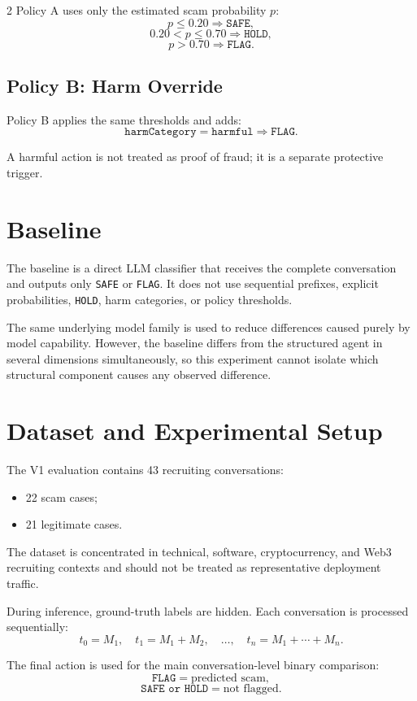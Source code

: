 \documentclass{article}
\begin{document}
\begin{multicols}{2}
Policy A uses only the estimated scam probability $p$:
\[
p \le 0.20 \Rightarrow \texttt{SAFE},
\]
\[
0.20 < p \le 0.70 \Rightarrow \texttt{HOLD},
\]
\[
p > 0.70 \Rightarrow \texttt{FLAG}.
\]

\subsection{Policy B: Harm Override}

Policy B applies the same thresholds and adds:
\[
\texttt{harmCategory}=\texttt{harmful}
\Rightarrow \texttt{FLAG}.
\]

A harmful action is not treated as proof of fraud; it is a separate protective trigger.

\section{Baseline}

The baseline is a direct LLM classifier that receives the complete conversation and outputs only \texttt{SAFE} or \texttt{FLAG}. It does not use sequential prefixes, explicit probabilities, \texttt{HOLD}, harm categories, or policy thresholds.

The same underlying model family is used to reduce differences caused purely by model capability. However, the baseline differs from the structured agent in several dimensions simultaneously, so this experiment cannot isolate which structural component causes any observed difference.

\section{Dataset and Experimental Setup}

The V1 evaluation contains 43 recruiting conversations:
\begin{itemize}
    \item 22 scam cases;
    \item 21 legitimate cases.
\end{itemize}

The dataset is concentrated in technical, software, cryptocurrency, and Web3 recruiting contexts and should not be treated as representative deployment traffic.

During inference, ground-truth labels are hidden. Each conversation is processed sequentially:
\[
t_0 = M_1,\quad
t_1 = M_1 + M_2,\quad \ldots,\quad
t_n = M_1 + \cdots + M_n.
\]

The final action is used for the main conversation-level binary comparison:
\[
\texttt{FLAG} = \text{predicted scam},
\]
\[
\texttt{SAFE or HOLD} = \text{not flagged}.
\]


\end{multicols}
\end{document}
